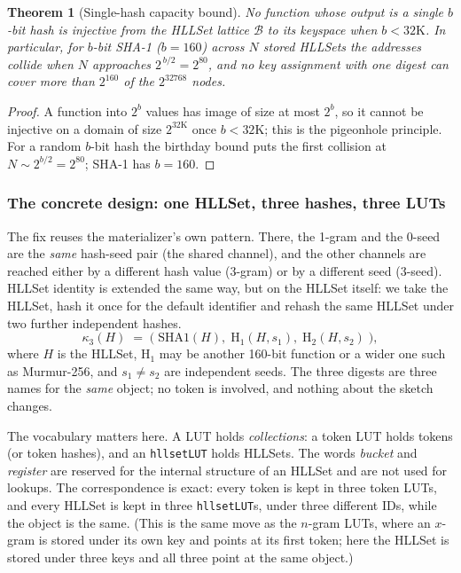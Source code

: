 \documentclass[11pt,a4paper]{article}
\newtheorem{theorem}{Theorem}[section]
\theoremstyle{remark}
\newcommand{\Lat}{\ensuremath{\mathcal{B}}}         %
\begin{document}
\begin{theorem}[Single-hash capacity bound]
\label{thm:single-hash}
No function whose output is a single $b$-bit hash is injective from the HLLSet
lattice $\Lat$ to its keyspace when $b < 32\mathrm{K}$. In particular, for
$b$-bit SHA-1 ($b=160$) across $N$ stored HLLSets the addresses collide when
$N$ approaches $2^{\,b/2} = 2^{80}$, and no key assignment with one digest can
cover more than $2^{160}$ of the $2^{32768}$ nodes.
\end{theorem}

\begin{proof}
A function into $2^b$ values has image of size at most $2^b$, so it cannot be
injective on a domain of size $2^{32\mathrm{K}}$ once $b<32\mathrm{K}$; this is
the pigeonhole principle. For a random $b$-bit hash the birthday bound puts the
first collision at $N\sim 2^{b/2} = 2^{80}$; SHA-1 has $b=160$.
\end{proof}

\subsubsection{The concrete design: one HLLSet, three hashes, three LUTs}

The fix reuses the materializer's own pattern. There, the 1-gram and the 0-seed
are the \emph{same} hash-seed pair (the shared channel), and the other channels
are reached either by a different hash value (3-gram) or by a different seed
(3-seed). HLLSet identity is extended the same way, but on the HLLSet itself:
we take the HLLSet, hash it once for the default identifier and rehash the same
HLLSet under two further independent hashes.
\begin{equation}
  \label{eq:concrete}
  \kappa_3(H) \;=\; \bigl(\;
  \mathrm{SHA1}(H),\;
  \mathrm{H}_1(H, s_1),\;
  \mathrm{H}_2(H, s_2)
  \;\bigr),
\end{equation}
where $H$ is the HLLSet, $\mathrm{H}_1$ may be another 160-bit function or a
wider one such as Murmur-256, and $s_1\neq s_2$ are independent seeds. The three
digests are three names for the \emph{same} object; no token is involved, and
nothing about the sketch changes.

The vocabulary matters here. A LUT holds \emph{collections}: a token LUT holds
tokens (or token hashes), and an \texttt{hllsetLUT} holds HLLSets. The words
\emph{bucket} and \emph{register} are reserved for the internal structure of an
HLLSet and are not used for lookups. The correspondence is exact: every token
is kept in three token LUTs, and every HLLSet is kept in three
\texttt{hllsetLUT}s, under three different IDs, while the object is the same.
(This is the same move as the $n$-gram LUTs, where an $x$-gram is stored under
its own key and points at its first token; here the HLLSet is stored under three
keys and all three point at the same object.)
\end{document}
